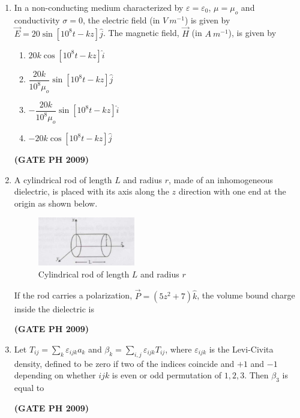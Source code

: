 \documentclass[14pt, a4paper]{extarticle}
\begin{document}
\begin{enumerate}[label=\textbf{Q. \arabic*}, start=21]
\item In a non-conducting medium characterized by $\varepsilon = \varepsilon_0$, $\mu = \mu_o$ and conductivity $\sigma = 0$, the electric field (in $V~m^{-1}$) is given by $\vec{E} = 20\sin[10^8 t - kz] \hat{j}$. The magnetic field, $\vec{H}$ (in $A~m^{-1}$), is given by
\begin{enumerate}
\item $20k \cos[10^8 t - kz] \hat{i}$
\item $\dfrac{20k}{10^8 \mu_o}\sin[10^8 t - kz] \hat{j}$
\item $-\dfrac{20k}{10^8 \mu_o}\sin[10^8 t - kz] \hat{i}$
\item $-20k \cos[10^8 t - kz] \hat{j}$
\end{enumerate}
\hfill \textbf{(GATE PH 2009)}

\item A cylindrical rod of length $L$ and radius $r$, made of an inhomogeneous dielectric, is placed with its axis along the $z$ direction with one end at the origin as shown below.
\begin{figure}[H]
\centering
\includegraphics[width=0.4\textwidth]{figs/Q25fig.png}
\caption{Cylindrical rod of length $L$ and radius $r$ }
\label{fig:q25}
\end{figure}
If the rod carries a polarization, $\vec{P} = (5z^2 + 7)\hat{k}$, the volume bound charge inside the dielectric is
\begin{enumerate}
\end{enumerate}
\hfill \textbf{(GATE PH 2009)}

\item Let $T_{ij} = \sum_k \varepsilon_{ijk} a_k$ and $\beta_k = \sum_{i,j} \varepsilon_{ijk} T_{ij}$, where $\varepsilon_{ijk}$ is the Levi-Civita density, defined to be zero if two of the indices coincide and $+1$ and $-1$ depending on whether $ijk$ is even or odd permutation of $1,2,3$. Then $\beta_3$ is equal to
\begin{enumerate}
\end{enumerate}
\hfill \textbf{(GATE PH 2009)}


\end{enumerate}
\end{document}

